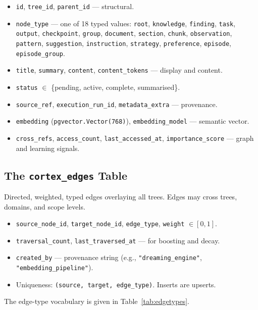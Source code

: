 \documentclass[11pt,a4paper]{article}
\theoremstyle{cortexprop}
\newcommand{\code}[1]{\texttt{#1}}
\begin{document}
\begin{itemize}
  \item \code{id}, \code{tree\_id}, \code{parent\_id} --- structural.
  \item \code{node\_type} --- one of 18 typed values: \code{root},
  \code{knowledge}, \code{finding}, \code{task}, \code{output},
  \code{checkpoint}, \code{group}, \code{document}, \code{section},
  \code{chunk}, \code{observation}, \code{pattern}, \code{suggestion},
  \code{instruction}, \code{strategy}, \code{preference}, \code{episode},
  \code{episode\_group}.
  \item \code{title}, \code{summary}, \code{content},
  \code{content\_tokens} --- display and content.
  \item \code{status} $\in$ \{pending, active, complete, summarised\}.
  \item \code{source\_ref}, \code{execution\_run\_id},
  \code{metadata\_extra} --- provenance.
  \item \code{embedding} (\code{pgvector.Vector(768)}),
  \code{embedding\_model} --- semantic vector.
  \item \code{cross\_refs}, \code{access\_count}, \code{last\_accessed\_at},
  \code{importance\_score} --- graph and learning signals.
\end{itemize}

\subsection{The \code{cortex\_edges} Table}

Directed, weighted, typed edges overlaying all trees. Edges may cross
trees, domains, and scope levels.

\begin{itemize}
  \item \code{source\_node\_id}, \code{target\_node\_id},
  \code{edge\_type}, \code{weight} $\in [0,1]$.
  \item \code{traversal\_count}, \code{last\_traversed\_at} --- for
  boosting and decay.
  \item \code{created\_by} --- provenance string (e.g.,
  \code{"dreaming\_engine"}, \code{"embedding\_pipeline"}).
  \item Uniqueness: \code{(source, target, edge\_type)}. Inserts are
  upserts.
\end{itemize}

The edge-type vocabulary is given in Table~\ref{tab:edgetypes}.
\end{document}
